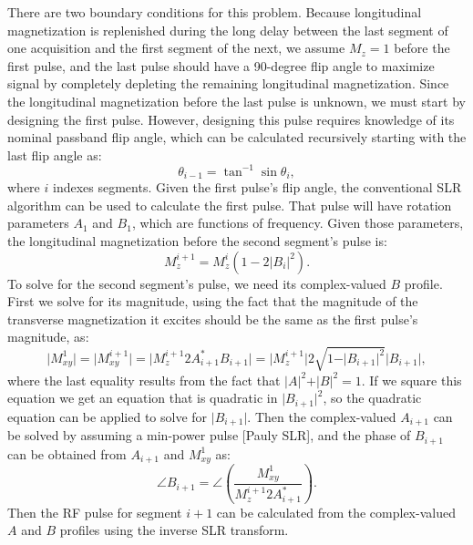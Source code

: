 \documentclass[11pt]{article}
\begin{document}
\par There are two boundary conditions for this problem. 
Because longitudinal magnetization is replenished during the long delay between the last segment of one acquisition and the first segment of the next, 
we assume $M_z = 1$ before the first pulse, 
and the last pulse should have a 90-degree flip angle to maximize signal by completely depleting the remaining longitudinal magnetization.
Since the longitudinal magnetization before the last pulse is unknown, 
we must start by designing the first pulse.
However, designing this pulse requires knowledge of its nominal passband flip angle,
which can be calculated recursively starting with the last flip angle as:
\begin{equation}
\theta_{i-1} = \tan^{-1} \sin \theta_i,
\label{eq:fliprecursion}
\end{equation}
where $i$ indexes segments.
Given the first pulse's flip angle, the conventional SLR algorithm can be used to calculate the first pulse. 
That pulse will have rotation parameters $A_1$ and $B_1$, which are functions of frequency.
Given those parameters, the longitudinal magnetization before the second segment's pulse is:
\begin{equation}
M_z^{i+1} = M_z^i \left( 1 - 2 \vert B_i \vert^2\right). 
\label{eq:mzrecursion}
\end{equation}
To solve for the second segment's pulse, 
we need its complex-valued $B$ profile. 
First we solve for its magnitude, 
using the fact that the magnitude of the transverse magnetization it excites should be the same as the first pulse's magnitude,
as:
\begin{equation}
\vert M_{xy}^1 \vert = \vert M_{xy}^{i+1} \vert =  \vert M_z^{i+1} 2 A^*_{i+1} B_{i+1} \vert = \vert M_z^{i+1} \vert 2 \sqrt{1 - \vert B_{i+1} \vert^2} \vert B_{i+1} \vert,
\label{eq:mxygre}
\end{equation}
where the last equality results from the fact that $\vert A \vert^2 + \vert B \vert^2 = 1$.
If we square this equation we get an 
equation that is quadratic in $\vert B_{i+1} \vert^2$, so the quadratic equation can be applied to solve for $\vert B_{i+1} \vert$.
Then the complex-valued $A_{i+1}$ can be solved by assuming a min-power pulse [Pauly SLR],
and the phase of $B_{i+1}$ can be obtained from $A_{i+1}$ and $M_{xy}^1$ as:
\begin{equation}
\angle B_{i+1} = \angle \left(\frac{M_{xy}^1}{M_z^{i+1} 2 A_{i+1}^* }\right).
\label{eq:bphase}
\end{equation}
Then the RF pulse for segment $i+1$ can be calculated from the complex-valued $A$ and $B$ profiles using the inverse SLR transform. 
\end{document}

